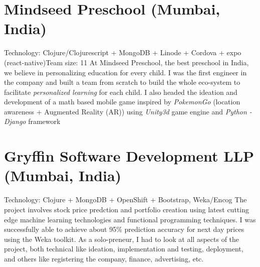 \documentclass[11pt,a4paper,sans]{moderncv} %
\begin{document}
\newpage{}
\section{Mindseed Preschool (Mumbai, India)}
         {Technology: Clojure/Clojurescript + MongoDB + Linode + Cordova + expo (react-native)}{Team size: 11}
         {At Mindseed Preschool, the best preschool in India, we believe in personalizing education for every child. I was the first engineer in the company and built a team from scratch to build the whole eco-system to facilitate \textit{personalized learning} for each child. I also headed the ideation and development of a math based mobile game inspired by \textit{PokemonGo} (location awareness + Augmented Reality (AR)) using \textit{Unity3d} game engine and \textit{Python - Django} framework}

\section{Gryffin Software Development LLP (Mumbai, India)}
         {}{Technology: Clojure + MongoDB + OpenShift + Bootstrap, Weka/Encog}
         {The project involves stock price predction and portfolio creation using latest cutting edge machine learning technologies and functional programming techniques. I was successfully able to achieve about 95\% prediction accuracy for next day prices using the Weka toolkit. As a solo-preneur, I had to look at all aspects of the project, both technical like ideation, implementation and testing, deployment, and others like registering the company, finance, advertising, etc.}

\end{document}
